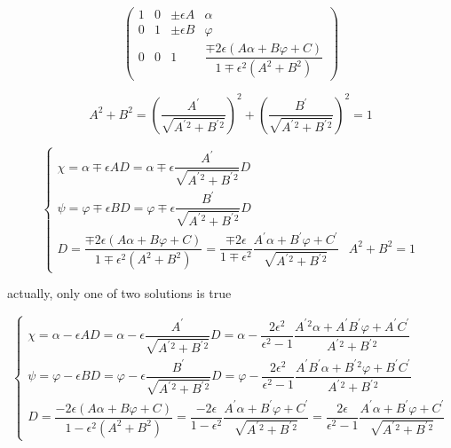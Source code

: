 \documentclass[
]{book}
\theoremstyle{definition}
\theoremstyle{definition}
\theoremstyle{definition}
\theoremstyle{definition}
\theoremstyle{remark}
\begin{document}
\[
\begin{pmatrix}1 & 0 & \pm\epsilon A & \alpha\\
0 & 1 & \pm\epsilon B & \varphi\\
0 & 0 & 1 & \dfrac{\mp2\epsilon\left(A\alpha+B\varphi+C\right)}{1\mp\epsilon^{2}\left(A^{2}+B^{2}\right)}
\end{pmatrix}
\]

\[
A^{2}+B^{2}=\left(\dfrac{A^{\prime}}{\sqrt{A^{\prime}{}^{2}+B^{\prime}{}^{2}}}\right)^{2}+\left(\dfrac{B^{\prime}}{\sqrt{A^{\prime}{}^{2}+B^{\prime}{}^{2}}}\right)^{2}=1
\]

\[
\begin{cases}
\chi=\alpha\mp\epsilon AD=\alpha\mp\epsilon\dfrac{A^{\prime}}{\sqrt{A^{\prime}{}^{2}+B^{\prime}{}^{2}}}D\\
\psi=\varphi\mp\epsilon BD=\varphi\mp\epsilon\dfrac{B^{\prime}}{\sqrt{A^{\prime}{}^{2}+B^{\prime}{}^{2}}}D\\
D=\dfrac{\mp2\epsilon\left(A\alpha+B\varphi+C\right)}{1\mp\epsilon^{2}\left(A^{2}+B^{2}\right)}=\dfrac{\mp2\epsilon}{1\mp\epsilon^{2}}\dfrac{A^{\prime}\alpha+B^{\prime}\varphi+C^{\prime}}{\sqrt{A^{\prime}{}^{2}+B^{\prime}{}^{2}}} & A^{2}+B^{2}=1
\end{cases}
\]

actually, only one of two solutions is true

\[
\begin{cases}
\chi=\alpha-\epsilon AD=\alpha-\epsilon\dfrac{A^{\prime}}{\sqrt{A^{\prime}{}^{2}+B^{\prime}{}^{2}}}D=\alpha-\dfrac{2\epsilon^{2}}{\epsilon^{2}-1}\dfrac{A^{\prime}{}^{2}\alpha+A^{\prime}B^{\prime}\varphi+A^{\prime}C^{\prime}}{A^{\prime}{}^{2}+B^{\prime}{}^{2}}\\
\psi=\varphi-\epsilon BD=\varphi-\epsilon\dfrac{B^{\prime}}{\sqrt{A^{\prime}{}^{2}+B^{\prime}{}^{2}}}D=\varphi-\dfrac{2\epsilon^{2}}{\epsilon^{2}-1}\dfrac{A^{\prime}B^{\prime}\alpha+B^{\prime}{}^{2}\varphi+B^{\prime}C^{\prime}}{A^{\prime}{}^{2}+B^{\prime}{}^{2}}\\
D=\dfrac{-2\epsilon\left(A\alpha+B\varphi+C\right)}{1-\epsilon^{2}\left(A^{2}+B^{2}\right)}=\dfrac{-2\epsilon}{1-\epsilon^{2}}\dfrac{A^{\prime}\alpha+B^{\prime}\varphi+C^{\prime}}{\sqrt{A^{\prime}{}^{2}+B^{\prime}{}^{2}}}=\dfrac{2\epsilon}{\epsilon^{2}-1}\dfrac{A^{\prime}\alpha+B^{\prime}\varphi+C^{\prime}}{\sqrt{A^{\prime}{}^{2}+B^{\prime}{}^{2}}}
\end{cases}
\]
\end{document}
